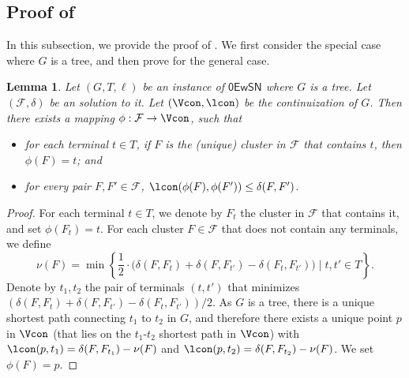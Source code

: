 \documentclass[11pt]{article}
\newtheorem{lemma}[theorem]{Lemma}
\theoremstyle{definition}
\newcommand{\set}[1]{\left\{ #1 \right\}}
\newcommand{\fset}{{\mathcal{F}}}
\newcounter{note}
\newcommand{\zesn}{\mathsf{0EwSN}}
\begin{document}
\begin{titlepage}
\subsection{Proof of }
\label{subsec: diam-girth}


In this subsection, we provide the proof of . We first consider the special case where $G$ is a tree, and then prove  for the general case.

\begin{lemma} \label{lem:embed-tree}
Let $(G,T,\ell)$ be an instance of $\zesn$ where $G$ is a tree. Let $(\fset,\delta)$ be an solution to it. Let $(\Vcon, \lcon)$ be the continuization of $G$. Then there exists a mapping $\phi: \fset \to \Vcon$, such that
\begin{itemize}
	\item for each terminal $t\in T$, if $F$ is the (unique) cluster in $\fset$ that contains $t$, then $\phi(F)=t$; and
	\item for every pair $F,F'\in \fset$,
	$\lcon(\phi(F),\phi(F')) \le \delta(F,F')$.
\end{itemize}
\end{lemma}

\begin{proof}
For each terminal $t\in T$, we denote by $F_t$ the cluster in $\fset$ that contains it, and set $\phi(F_t)=t$.
For each cluster $F\in \fset$ that does not contain any terminals, we define \[\nu(F)=\min\set{\frac{1}{2}\cdot \big(\delta(F,F_t)+\delta(F,F_{t'})-\delta(F_t,F_{t'})\big)\mid t,t'\in T}.\]
Denote by $t_1,t_2$ the pair of terminals $(t,t')$ that minimizes $(\delta(F,F_t)+\delta(F,F_{t'})-\delta(F_t,F_{t'}))/2$.
As $G$ is a tree, there is a unique shortest path connecting $t_1$ to $t_2$ in $G$, and therefore there exists a unique point $p$ in $\Vcon$ (that lies on the $t_1$-$t_2$ shortest path in $\Vcon$) with $\lcon(p,t_1)=\delta(F,F_{t_1})-\nu(F)$ and $\lcon(p,t_2)=\delta(F,F_{t_2})-\nu(F)$. We set $\phi(F)=p$.
	

\end{proof}
\end{titlepage}
\end{document}
